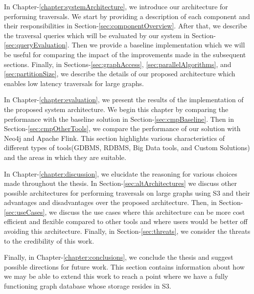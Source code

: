 \medskip
In Chapter-\ref{chapter:systemArchitecture}, we introduce our architecture for
performing traversals. We start by providing a description of each component and their
responsibilities in Section-\ref{sec:componentOverview}. After that, we describe
the traversal queries which will be evaluated by our system in Section-\ref{sec:queryEvaluation}.
Then we provide a baseline implementation which we will be useful for comparing
the impact of the improvements made in the subsequent sections. Finally, in
Sections-\ref{sec:graphAccess}, \ref{sec:parallelAlgorithms}, and
\ref{sec:partitionSize}, we describe the details of our proposed architecture
which enables low latency traversals for large graphs.

\medskip
In Chapter-\ref{chapter:evaluation}, we present the results of the
implementation of the proposed system architecture. We begin this chapter by
comparing the performance with the baseline solution in
Section-\ref{sec:cmpBaseline}. Then in Section-\ref{sec:cmpOtherTools}, we
compare the performance of our solution with Neo4j and Apache Flink. This
section highlights various characteristics of different types of tools(GDBMS,
RDBMS, Big Data tools, and Custom Solutions) and the areas in which they 
are suitable. 

\medskip
In Chapter-\ref{chapter:discussion}, we elucidate the reasoning for various choices
made throughout the thesis.
In Section-\ref{sec:altArchitectures} we discuss other possible architectures for
performing traversals on large graphs using S3 and their advantages and
disadvantages over the proposed architecture. Then, in
Section-\ref{sec:useCases}, we discuss the use cases where this architecture
can be more cost efficient and flexible compared to other tools and where users
would be better off avoiding this architecture. Finally, in
Section-\ref{sec:threats}, we consider the threats to the credibility of this
work.

\medskip
Finally, in Chapter-\ref{chapter:conclusions}, we conclude the thesis and
suggest possible directions for future work. This section contains information
about how we may be able to extend this work to reach a point where we have a
fully functioning graph database whose storage resides in S3.
